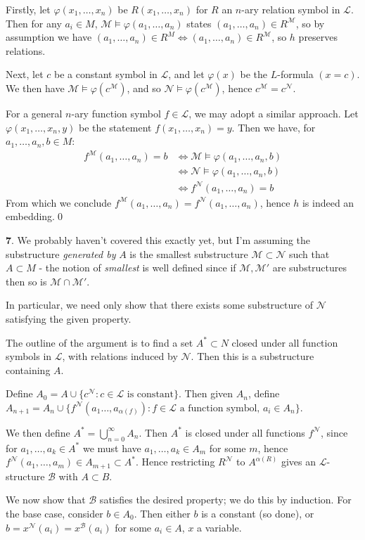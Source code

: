 \documentclass[]{article}
\theoremstyle{custhm}
\theoremstyle{cusdef}
\theoremstyle{custhm}
\theoremstyle{custhm}
\theoremstyle{custhm}
\theoremstyle{custhm}
\theoremstyle{cusdef}
\theoremstyle{remark}
\newcommand{\N}{\mathcal{N}}
\renewcommand{\L}{\mathcal{L}}
\renewcommand{\it}[1]{\textit{#1}}
\newcommand{\M}{\mathcal{M}}
\renewcommand{\phi}{\varphi}
\begin{document}
Firstly, let $\phi(x_1,\dots,x_n)$ be $R(x_1,\dots,x_n)$ for $R$ an $n$-ary relation symbol in $\L$. Then for any $a_i\in M$, $\M\models \phi(a_1,\dots,a_n)$ states $(a_1,\dots,a_n)\in R^\M$, so by assumption we have $(a_1,\dots,a_n)\in R^M\iff (a_1,\dots,a_n)\in R^\M$, so $h$ preserves relations.

Next, let $c$ be a constant symbol in $\L$, and let $\phi(x)$ be the $L$-formula $(x=c)$. We then have $\M\models \phi(c^\M)$, and so $\N\models\phi(c^\M)$, hence $c^\M = c^\N$.

For a general $n$-ary function symbol $f\in \L$, we may adopt a similar approach. Let $\phi(x_1,\dots,x_n,y)$ be the statement $f(x_1,\dots,x_n) = y$. Then we have, for $a_1,\dots,a_n,b\in M$:
\begin{align*}
f^\M(a_1,\dots,a_n) = b &\iff \M \models \phi(a_1,\dots,a_n,b)\\
&\iff \N \models \phi(a_1,\dots,a_n,b)\\
& \iff f^\N(a_1,\dots,a_n) = b
\end{align*}
From which we conclude $f^\M(a_1,\dots,a_n) = f^\N(a_1,\dots,a_n)$, hence $h$ is indeed an embedding.\qed

\textbf{7}. We probably haven't covered this exactly yet, but I'm assuming the substructure \it{generated by} $A$ is the smallest substructure $\M \subset \N$ such that $A\subset M$ - the notion of \it{smallest} is well defined since if $\M,\M'$ are substructures then so is $\M\cap\M'$.

In particular, we need only show that there exists some substructure of $\N$ satisfying the given property.

The outline of the argument is to find a set $A^\ast \subset N$ closed under all function symbols in $\L$, with relations induced by $\N$. Then this is a substructure containing $A$.

Define $A_0 = A\cup\{c^\N:c\in\L\textrm{ is constant}\}$. Then given $A_n$, define $A_{n+1} = A_n \cup \{ f^\N(a_1\dots,a_{\alpha(f)}): f\in \L \textrm{ a function symbol, }a_i\in A_n \}$.

We then define $A^\ast = \bigcup_{n=0}^{\infty}A_n$. Then $A^\ast$ is closed under all functions $f^\N$, since for $a_1,\dots,a_k\in A^\ast$ we must have $a_1,\dots,a_k\in A_m$ for some $m$, hence $f^\N(a_1,\dots,a_m)\in A_{m+1}\subset A^\ast$. Hence restricting $R^\N$ to $A^{\alpha(R)}$ gives an $\L$-structure $\mathcal{B}$ with $A\subset B$.

We now show that $\mathcal{B}$ satisfies the desired property; we do this by induction. For the base case, consider $b\in A_0$. Then either $b$ is a constant (so done), or $b = x^\N(a_i)=x^\mathcal{B}(a_i)$ for some $a_i\in A$, $x$ a variable.
\end{document}
